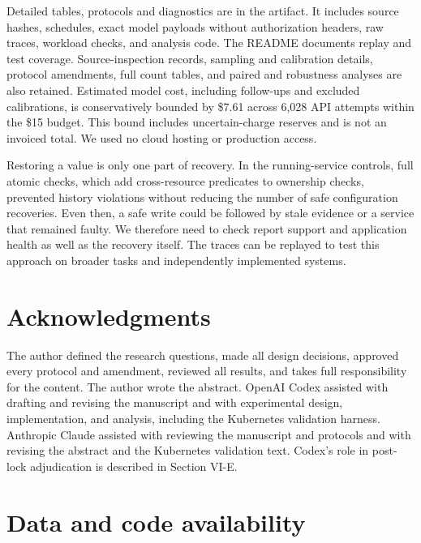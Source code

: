 \documentclass[conference,10pt]{IEEEtran}
\begin{document}
Detailed tables, protocols and diagnostics are in the artifact. It includes source hashes, schedules, exact model payloads without authorization headers, raw traces, workload checks, and analysis code. The README documents replay and test coverage. Source-inspection records, sampling and calibration details, protocol amendments, full count tables, and paired and robustness analyses are also retained. Estimated model cost, including follow-ups and excluded calibrations, is conservatively bounded by \$7.61 across 6,028 API attempts within the \$15 budget. This bound includes uncertain-charge reserves and is not an invoiced total. We used no cloud hosting or production access.

Restoring a value is only one part of recovery. In the running-service controls, full atomic checks, which add cross-resource predicates to ownership checks, prevented history violations without reducing the number of safe configuration recoveries. Even then, a safe write could be followed by stale evidence or a service that remained faulty. We therefore need to check report support and application health as well as the recovery itself. The traces can be replayed to test this approach on broader tasks and independently implemented systems.

\section*{Acknowledgments}

The author defined the research questions, made all design decisions, approved every protocol and amendment, reviewed all results, and takes full responsibility for the content. The author wrote the abstract. OpenAI Codex assisted with drafting and revising the manuscript and with experimental design, implementation, and analysis, including the Kubernetes validation harness. Anthropic Claude assisted with reviewing the manuscript and protocols and with revising the abstract and the Kubernetes validation text. Codex's role in post-lock adjudication is described in Section VI-E.

\section*{Data and code availability}
\end{document}
